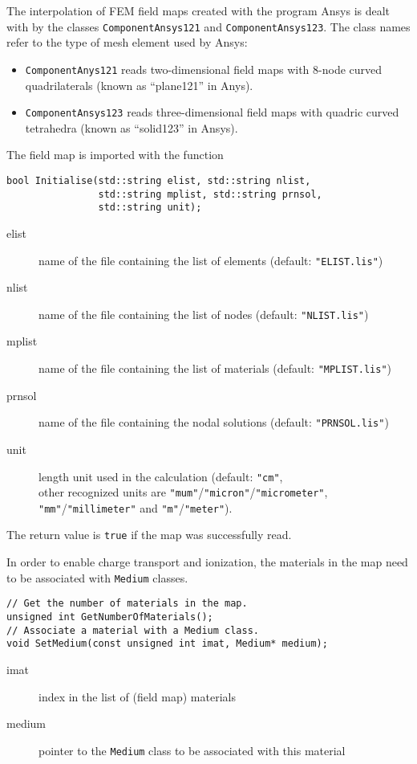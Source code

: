 The interpolation of FEM field maps 
created with the program Ansys \cite{ANSYS} 
is dealt with by the classes
\texttt{ComponentAnsys121} and \texttt{ComponentAnsys123}. 
The class names refer to the type of mesh element used by Ansys:
  \begin{itemize}
  \item
  \texttt{ComponentAnys121} reads two-dimensional field maps 
with 8-node curved quadrilaterals (known as ``plane121'' in Anys). 
  \item
  \texttt{ComponentAnsys123} reads three-dimensional field maps 
with quadric curved tetrahedra (known as ``solid123'' in Ansys).
  \end{itemize}
The field map is imported with the function
\begin{lstlisting}
bool Initialise(std::string elist, std::string nlist,
                std::string mplist, std::string prnsol,
                std::string unit);
\end{lstlisting}
\begin{description}
  \item[elist]
  name of the file containing the list of elements 
  (default: \texttt{"ELIST.lis"})
  \item[nlist]
  name of the file containing the list of nodes
  (default: \texttt{"NLIST.lis"})
  \item[mplist]
  name of the file containing the list of materials
  (default: \texttt{"MPLIST.lis"})
  \item[prnsol]
  name of the file containing the nodal solutions
  (default: \texttt{"PRNSOL.lis"})
  \item[unit]
  length unit used in the calculation (default: \texttt{"cm"}, \\ 
  other recognized units are 
  \texttt{"mum"}/\texttt{"micron"}/\texttt{"micrometer"},
  \texttt{"mm"}/\texttt{"millimeter"} and 
  \texttt{"m"}/\texttt{"meter"}).
\end{description}
The return value is \texttt{true} if the map was successfully read. 

In order to enable charge transport and ionization,
the materials in the map need to be associated with \texttt{Medium} classes.
\begin{lstlisting}
// Get the number of materials in the map.
unsigned int GetNumberOfMaterials();
// Associate a material with a Medium class.
void SetMedium(const unsigned int imat, Medium* medium);
\end{lstlisting}
\begin{description}
\item[imat]
index in the list of (field map) materials
\item[medium]
pointer to the \texttt{Medium} class to be associated with this material
\end{description}

